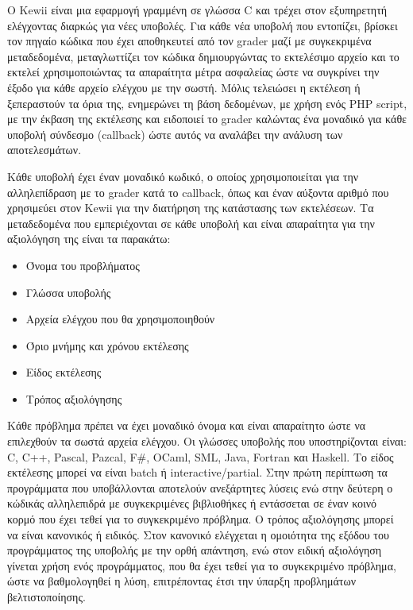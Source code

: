 \documentclass[diploma]{softlab-thesis}
\begin{document}
Ο Kewii είναι μια εφαρμογή γραμμένη σε γλώσσα C και τρέχει στον εξυπηρετητή
ελέγχοντας διαρκώς για νέες υποβολές. Για κάθε νέα υποβολή που εντοπίζει,
βρίσκει τον πηγαίο κώδικα που έχει αποθηκευτεί από τον grader μαζί με συγκεκριμένα
μεταδεδομένα, μεταγλωττίζει τον κώδικα δημιουργώντας το εκτελέσιμο αρχείο και το
εκτελεί χρησιμοποιώντας τα απαραίτητα μέτρα ασφαλείας ώστε να συγκρίνει την έξοδο
για κάθε αρχείο ελέγχου με την σωστή. Μόλις τελειώσει η εκτέλεση ή ξεπεραστούν τα
όρια της, ενημερώνει τη βάση δεδομένων, με χρήση ενός PHP script, με την έκβαση της
εκτέλεσης και ειδοποιεί το grader καλώντας ένα μοναδικό για κάθε υποβολή σύνδεσμο
(callback) ώστε αυτός να αναλάβει την ανάλυση των αποτελεσμάτων.

\bigskip

Κάθε υποβολή έχει έναν μοναδικό κωδικό, ο οποίος χρησιμοποιείται για την
αλληλεπίδραση με το grader κατά το callback, όπως και έναν αύξοντα αριθμό που
χρησιμεύει στον Kewii για την διατήρηση της κατάστασης των εκτελέσεων. Τα
μεταδεδομένα που εμπεριέχονται σε κάθε υποβολή και είναι απαραίτητα για την
αξιολόγηση της είναι τα παρακάτω:

\begin{itemize}
  \item Όνομα του προβλήματος
  \item Γλώσσα υποβολής
  \item Αρχεία ελέγχου που θα χρησιμοποιηθούν
  \item Όριο μνήμης και χρόνου εκτέλεσης
  \item Είδος εκτέλεσης
  \item Τρόπος αξιολόγησης
\end{itemize}

Κάθε πρόβλημα πρέπει να έχει μοναδικό όνομα και είναι απαραίτητο ώστε να
επιλεχθούν τα σωστά αρχεία ελέγχου. Οι γλώσσες υποβολής που υποστηρίζονται
είναι: C, C++, Pascal, Pazcal, F\#, OCaml, SML, Java, Fortran και Haskell. Το
είδος εκτέλεσης μπορεί να είναι batch ή interactive/partial. Στην πρώτη
περίπτωση τα προγράμματα που υποβάλλονται αποτελούν ανεξάρτητες λύσεις ενώ στην
δεύτερη ο κώδικάς αλληλεπιδρά με συγκεκριμένες βιβλιοθήκες ή εντάσσεται σε έναν
κοινό κορμό που έχει τεθεί για το συγκεκριμένο πρόβλημα. Ο τρόπος αξιολόγησης
μπορεί να είναι κανονικός ή ειδικός. Στον κανονικό ελέγχεται η ομοιότητα της
εξόδου του προγράμματος της υποβολής με την ορθή απάντηση, ενώ στον ειδική
αξιολόγηση γίνεται χρήση ενός προγράμματος, που θα έχει τεθεί για το
συγκεκριμένο πρόβλημα, ώστε να βαθμολογηθεί η λύση, επιτρέποντας έτσι την
ύπαρξη προβλημάτων βελτιστοποίησης.
\end{document}
